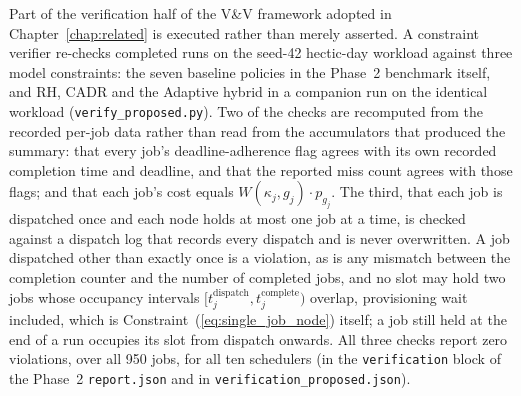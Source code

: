 Part of the verification half of the V\&V framework adopted in Chapter~\ref{chap:related} is executed rather than merely asserted. A constraint verifier re-checks completed runs on the seed-42 hectic-day workload against three model constraints: the seven baseline policies in the Phase~2 benchmark itself, and RH, CADR and the Adaptive hybrid in a companion run on the identical workload (\texttt{verify\_proposed.py}). Two of the checks are recomputed from the recorded per-job data rather than read from the accumulators that produced the summary: that every job's deadline-adherence flag agrees with its own recorded completion time and deadline, and that the reported miss count agrees with those flags; and that each job's cost equals $W(\kappa_j, g_j) \cdot p_{g_j}$. The third, that each job is dispatched once and each node holds at most one job at a time, is checked against a dispatch log that records every dispatch and is never overwritten. A job dispatched other than exactly once is a violation, as is any mismatch between the completion counter and the number of completed jobs, and no slot may hold two jobs whose occupancy intervals $[t_j^{\text{dispatch}}, t_j^{\text{complete}})$ overlap, provisioning wait included, which is Constraint~(\ref{eq:single_job_node}) itself; a job still held at the end of a run occupies its slot from dispatch onwards. All three checks report zero violations, over all 950 jobs, for all ten schedulers (in the \texttt{verification} block of the Phase~2 \texttt{report.json} and in \texttt{verification\_proposed.json}).
